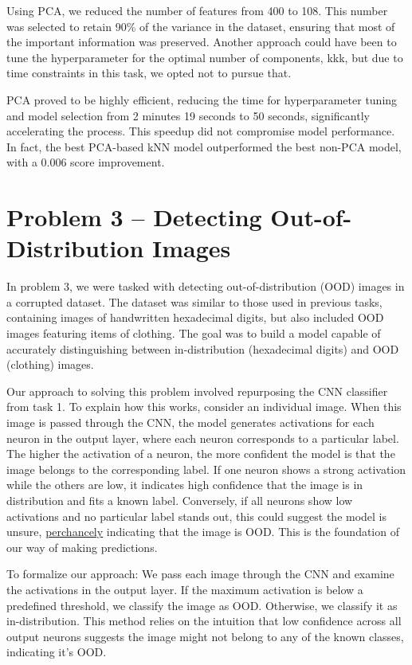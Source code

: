 \documentclass{article}
\begin{document}
Using PCA, we reduced the number of features from 400 to 108. This number was selected to retain 90\% of the variance in the dataset, ensuring that most of the important information was preserved. Another approach could have been to tune the hyperparameter for the optimal number of components, kkk, but due to time constraints in this task, we opted not to pursue that.

PCA proved to be highly efficient, reducing the time for hyperparameter tuning and model selection from 2 minutes 19 seconds to 50 seconds, significantly accelerating the process. This speedup did not compromise model performance. In fact, the best PCA-based kNN model outperformed the best non-PCA model, with a 0.006 score improvement.


\newpage

\section{Problem 3 – Detecting Out-of-Distribution Images}

In problem 3, we were tasked with detecting out-of-distribution (OOD) images in a corrupted dataset. The dataset was similar to those used in previous tasks, containing images of handwritten hexadecimal digits, but also included OOD images featuring items of clothing. The goal was to build a model capable of accurately distinguishing between in-distribution (hexadecimal digits) and OOD (clothing) images.

Our approach to solving this problem involved repurposing the CNN classifier from task 1. To explain how this works, consider an individual image. When this image is passed through the CNN, the model generates activations for each neuron in the output layer, where each neuron corresponds to a particular label. The higher the activation of a neuron, the more confident the model is that the image belongs to the corresponding label. If one neuron shows a strong activation while the others are low, it indicates high confidence that the image is in distribution and fits a known label. Conversely, if all neurons show low activations and no particular label stands out, this could suggest the model is unsure, \href{https://www.youtube.com/watch?v=FU7vA8rVkLA}{perchancely} indicating that the image is OOD. This is the foundation of our way of making predictions. 

To formalize our approach: We pass each image through the CNN and examine the activations in the output layer. If the maximum activation is below a predefined threshold, we classify the image as OOD. Otherwise, we classify it as in-distribution. This method relies on the intuition that low confidence across all output neurons suggests the image might not belong to any of the known classes, indicating it's OOD.
\end{document}
